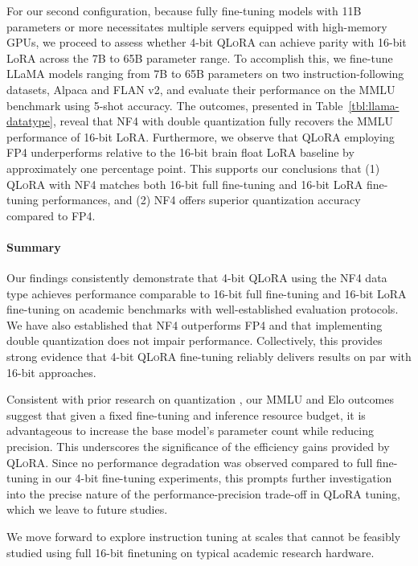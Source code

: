 For our second configuration, because fully fine-tuning models with 11B parameters or more necessitates multiple servers equipped with high-memory GPUs, we proceed to assess whether 4-bit \textsc{QLoRA} can achieve parity with 16-bit LoRA across the 7B to 65B parameter range. To accomplish this, we fine-tune LLaMA models ranging from 7B to 65B parameters on two instruction-following datasets, Alpaca and FLAN v2, and evaluate their performance on the MMLU benchmark using 5-shot accuracy. The outcomes, presented in Table~\ref{tbl:llama-datatype}, reveal that NF4 with double quantization fully recovers the MMLU performance of 16-bit LoRA. Furthermore, we observe that \textsc{QLoRA} employing FP4 underperforms relative to the 16-bit brain float LoRA baseline by approximately one percentage point. This supports our conclusions that (1) \textsc{QLoRA} with NF4 matches both 16-bit full fine-tuning and 16-bit LoRA fine-tuning performances, and (2) NF4 offers superior quantization accuracy compared to FP4.

\paragraph{Summary} Our findings consistently demonstrate that 4-bit \textsc{QLoRA} using the NF4 data type achieves performance comparable to 16-bit full fine-tuning and 16-bit LoRA fine-tuning on academic benchmarks with well-established evaluation protocols. We have also established that NF4 outperforms FP4 and that implementing double quantization does not impair performance. Collectively, this provides strong evidence that 4-bit \textsc{QLoRA} fine-tuning reliably delivers results on par with 16-bit approaches.

Consistent with prior research on quantization \citep{dettmers2022case}, our MMLU and Elo outcomes suggest that given a fixed fine-tuning and inference resource budget, it is advantageous to increase the base model’s parameter count while reducing precision. This underscores the significance of the efficiency gains provided by \textsc{QLoRA}. Since no performance degradation was observed compared to full fine-tuning in our 4-bit fine-tuning experiments, this prompts further investigation into the precise nature of the performance-precision trade-off in QLoRA tuning, which we leave to future studies.

We move forward to explore instruction tuning at scales that cannot be feasibly studied using full 16-bit finetuning on typical academic research hardware.

